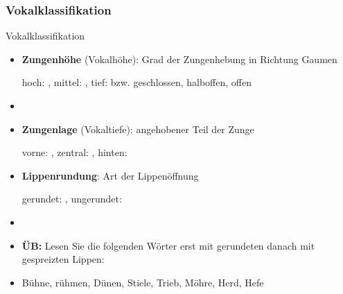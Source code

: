 %
\subsubsection{Vokalklassifikation}
%

\begin{frame}{Vokalklassifikation}

	\begin{itemize}
		\item \textbf{Zungenhöhe} (Vokalhöhe): Grad der Zungenhebung in Richtung Gaumen

		\ea hoch: \textipa{[ i: ]}, mittel: \textipa{[ o: ]}, tief: \textipa{[ a: ]} bzw. geschlossen, halboffen, offen
		\z

		\item[]
		\item \textbf{Zungenlage} (Vokaltiefe): angehobener Teil der Zunge

		\ea vorne: \textipa{[ i: ]}, zentral: \textipa{[ a: ]}, hinten: \textipa{[ u: ]}
		\z

	\end{itemize}
	
\end{frame}



\begin{frame}

	\begin{itemize}
		\item \textbf{Lippenrundung}: Art der Lippenöffnung

		\ea gerundet: \textipa{[ o: ]}, ungerundet: \textipa{[ i: ]}
		\z

		\item[]
		\item\textbf{ÜB:} Lesen Sie die folgenden Wörter erst mit gerundeten danach mit gespreizten Lippen:
		\item[] Bühne, rühmen, Dünen, Stiele, Trieb, Möhre, Herd, Hefe
	\end{itemize}
	
\end{frame}



